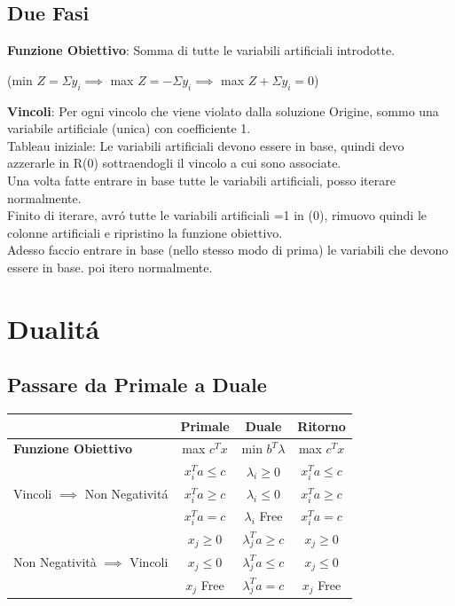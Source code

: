 \documentclass[12pt, a4paper, openany]{book}
\begin{document}
\subsection{Due Fasi}

\textbf{Funzione Obiettivo}:
Somma di tutte le variabili artificiali introdotte.
\begin{center}
	(min $Z= \Sigma y_i \implies$ max $Z= - \Sigma y_i \implies$ max $Z+\Sigma y_i = 0$)
\end{center}
\textbf{Vincoli}: Per ogni vincolo che viene violato dalla soluzione Origine, sommo una variabile artificiale (unica) con coefficiente 1.\\
Tableau iniziale: Le variabili artificiali devono essere in base, quindi devo azzerarle in R(0) sottraendogli il vincolo a cui sono associate.\\
Una volta fatte entrare in base tutte le variabili artificiali, posso iterare normalmente.\\
Finito di iterare, avró tutte le variabili artificiali =1 in (0), rimuovo quindi le colonne artificiali e ripristino la funzione obiettivo.\\
Adesso faccio entrare in base (nello stesso modo di prima) le variabili che devono essere in base. poi itero normalmente.\\

\section{Dualitá}
\subsection{Passare da Primale a Duale}

\begin{center}
\begin{tabular}{|l|c|c|c|}
	\hline
    & \textbf{Primale} & \textbf{Duale} & \textbf{Ritorno} \\
	\hline
    \textbf{Funzione Obiettivo} & max $c^T x$ & min $b^T \lambda$ & max $c^T x$ \\
    \hline
    \multirow{3}{*}{Vincoli $\implies$ Non Negativitá}
    &$x_i^Ta \leq c$ & $\lambda_i \geq 0$& $x_i^Ta \leq c$\\
	\cline{2-4}
    &$x_i^Ta \geq c$  & $\lambda_i \leq 0$&  $x_i^Ta \geq c$ \\
	\cline{2-4}
    &$x_i^Ta = c$ & $\lambda_i$ Free&  $x_i^Ta = c$\\
	\hline
    \multirow{3}{*}{Non Negatività $\implies$ Vincoli}
    &$x_j \geq 0 $ & $\lambda^T_ja \geq c$& $x_j \geq 0 $\\
	\cline{2-4}
    &$x_j \leq 0 $ & $\lambda^T_ja \leq c$& $x_j \leq 0 $\\
	\cline{2-4}
    &$x_j$ Free & $\lambda^T_ja = c$& $x_j$ Free\\
	\hline
\end{tabular}
\end{center}
\end{document}
